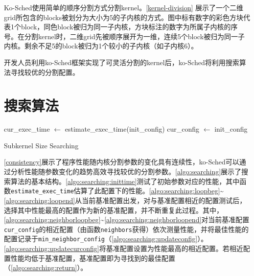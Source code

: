 Ko-Sched使用简单的顺序分割方式分割kernel。\autoref{kernel-division} 展示了一个二维grid所包含的blocks被划分为大小为5的子内核的方式。图中标有数字的彩色方块代表1个block，同色block被归为同一子内核，方块标注的数字为所属子内核的序号。在分割kernel时，二维grid先被顺序展开为一维，连续5个block被归为同一子内核。剩余不足5的block被归为1个较小的子内核（如子内核6）。

开发人员利用ko-Sched框架实现了可灵活分割的kernel后，ko-Sched将利用搜索算法寻找较优的分割配置。

\section{搜索算法}

\begin{algorithm}[htbp]
    \SetAlgoLined
    cur\_exec\_time $\gets$ estimate\_exec\_time(init\_config)\; \label{algo:searching:inittime}
    cur\_config $\gets$ init\_config\; \label{algo:searching:initconfig}
    \label{algo:searching:loopend}
    \caption{Subkernel Size Searching}
    \label{algo:searching}
\end{algorithm}

\autoref{consistency}展示了程序性能随内核分割参数的变化具有连续性，ko-Sched可以通过分析性能随参数变化的趋势高效寻找较优的分割参数。\autoref{algo:searching}展示了搜索算法的基本结构。\autoref{algo:searching:inittime}测试了初始参数对应的性能，其中函数\texttt{estimate\_exec\_time}估算了此配置下的性能。\autoref{algo:searching:loopbeg}\textasciitilde\autoref{algo:searching:loopend}从当前基准配置出发，对与基准配置相近的配置测试后，选择其中性能最高的配置作为新的基准配置，并不断重复此过程。其中，\autoref{algo:searching:neighborloopbeg}\textasciitilde\autoref{algo:searching:neighborloopend}对当前基准配置\texttt{cur\_config}的相近配置（由函数\texttt{neighbors}获得）依次测量性能，并将最佳性能的配置记录于\texttt{min\_neighbor\_config}（\autoref{algo:searching:updateconfig}）。\autoref{algo:searching:updatecurconfig}将基准配置设置为性能最高的相近配置。若相近配置性能均低于基准配置，基准配置即为寻找到的最佳配置（\autoref{algo:searching:return}）。

